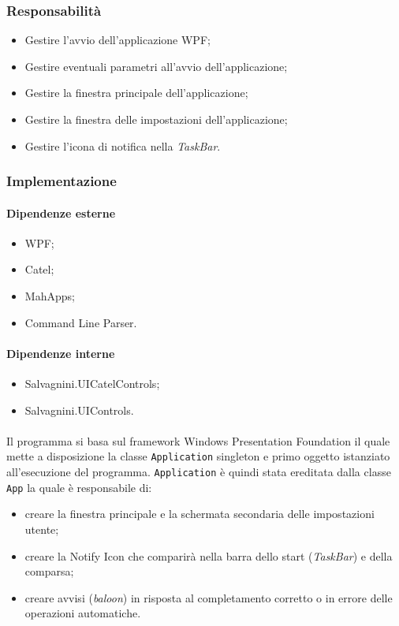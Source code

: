 \documentclass[../RelazioneFinale.tex]{subfiles}
\begin{document}
			\subsubsection{Responsabilità}
				\begin{itemize}
					\item Gestire l'avvio dell'applicazione WPF;
					\item Gestire eventuali parametri all'avvio dell'applicazione;
					\item Gestire la finestra principale dell'applicazione;
					\item Gestire la finestra delle impostazioni dell'applicazione;
					\item Gestire l'icona di notifica nella \emph{TaskBar}.
				\end{itemize}
			
			\subsubsection{Implementazione}

				\paragraph{Dipendenze esterne}
					\begin{itemize}
						\item WPF;
						\item Catel;
						\item MahApps;
						\item Command Line Parser.
					\end{itemize}
					
				\paragraph{Dipendenze interne}
					\begin{itemize}
						\item Salvagnini.UICatelControls;
						\item Salvagnini.UIControls.
					\end{itemize}		
			
				\paragraph{}
				Il programma si basa sul framework Windows Presentation Foundation il quale mette a disposizione la classe \verb|Application| singleton e primo oggetto istanziato all'esecuzione del programma. \verb|Application| è quindi stata ereditata dalla classe \verb|App| la quale è responsabile di:
				\begin{itemize}
					\item creare la finestra principale e la schermata secondaria delle impostazioni utente;
					\item creare la Notify Icon che comparirà nella barra dello start (\emph{TaskBar}) e della comparsa;
					\item creare avvisi (\emph{baloon}) in risposta al completamento corretto o in errore delle operazioni automatiche.
				\end{itemize}
				
\end{document}
